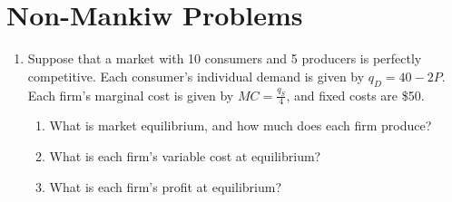 \documentclass{article}
\begin{document}
\section*{Non-Mankiw Problems}

\begin{enumerate}

\item Suppose that a market with 10 consumers and 5 producers is perfectly competitive. Each consumer's individual demand is given by $q_D = 40 - 2P$. Each firm's marginal cost is given by $MC = \frac{q_S}{4}$, and fixed costs are \$50.

	\begin{enumerate}
	
	\item What is market equilibrium, and how much does each firm produce?
	
	\item What is each firm's variable cost at equilibrium?
	
	\item What is each firm's profit at equilibrium?
	
	\end{enumerate}

\end{enumerate}
\end{document}
